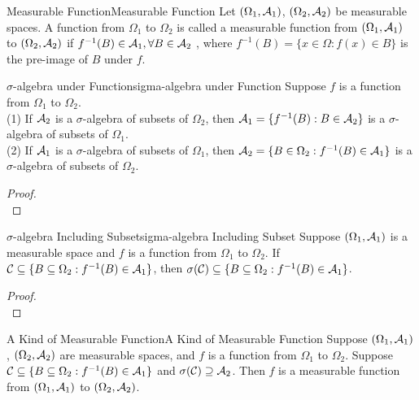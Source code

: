 \documentclass{elegantbook}
\begin{document}
\begin{definition}{Measurable Function}{Measurable Function}
Let $(\Omega_1,\mathcal{A}_1)$, $(\Omega_2,\mathcal{A}_2)$ be measurable spaces. A function from $\Omega_1$ to $\Omega_2$ is called a measurable function from $(\Omega_1,\mathcal{A}_1)$ to  $(\Omega_2,\mathcal{A}_2)$ if $f^{-1}(B)\in \mathcal{A}_1,\forall B\in\mathcal{A}_2$ , where $f^{-1} (B)=\{x\in\Omega:f(x)\in B\}$ is the 
pre-image of $B$ under $f$.
\end{definition}

\begin{lemma}{$\sigma$-algebra under Function}{sigma-algebra under Function}
Suppose $f$ is a function from $\Omega_1$ to $\Omega_2$.\\
(1) If $\mathcal{A}_2$ is a $\sigma$-algebra of subsets of  $\Omega_2$, then $\mathcal{A}_1=\{f^{-1} (B):B\in\mathcal{A} _2\}$ is a $\sigma$-algebra of subsets of $\Omega_1$.\\
(2) If $\mathcal{A}_1$ is a $\sigma$-algebra of subsets of $\Omega_1$, then $\mathcal{A}_2=\{B\in\Omega_2:f^{-1} (B)\in\mathcal{A}_1\}$ is a $\sigma$-algebra of subsets of $\Omega_2$.
\end{lemma}

\begin{proof}
\\[4cm]\vspace{0.01cm}
\end{proof}

\begin{theorem}{$\sigma$-algebra Including Subset}{sigma-algebra Including Subset}
Suppose $(\Omega_1,\mathcal{A}_1)$ is a measurable space and $f$ is a function from $\Omega_1$ to $\Omega_2$. If $\mathcal{C}\subseteq\{B\subseteq\Omega_2: f^{-1} (B)\in\mathcal{A}_1\}$, then $\sigma(\mathcal{C})\subseteq\{B\subseteq\Omega_2: f^{-1} (B)\in\mathcal{A}_1\}$.
\end{theorem}

\begin{proof}
\\[4cm]\vspace{0.01cm}
\end{proof}

\begin{corollary}{A Kind of Measurable Function}{A Kind of Measurable Function}
Suppose $(\Omega_1,\mathcal{A}_1)$, $(\Omega_2,\mathcal{A}_2)$ are measurable spaces, and $f$ is a function from $\Omega_1$ to $\Omega_2$. Suppose $\mathcal{C}\subseteq\{B\subseteq\Omega_2: f^{-1} (B)\in\mathcal{A}_1\}$ and $\sigma(\mathcal{C})\supseteq\mathcal{A}_2$. Then $f$ is a measurable function from $(\Omega_1,\mathcal{A}_1)$ to $(\Omega_2,\mathcal{A}_2)$.
\end{corollary}
\end{document}
